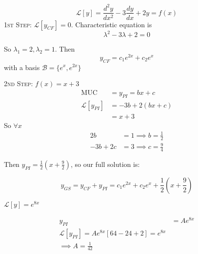 \documentclass[10pt]{scrartcl}
\begin{document}
\begin{example}
\[\mathcal{L}[y] = \frac{d^2y}{dx^2} - 3\frac{dy}{dx} + 2y = f(x)\]	
\textsc{1st Step:} $\mathcal{L}[y_{CF}] = 0$. Characteristic equation is 
\[
  \lambda^2 - 3\lambda + 2 = 0
\]

So $\lambda_1 = 2, \lambda_2 = 1$. Then 
\[y_{CF} = c_1e^{2x} + c_2e^{x}\]
with a basis $\mathcal{B} = \{e^{x}, e^{2x}\}$

\textsc{2nd Step:} $f(x) = x+3$
\[
\begin{aligned}
  \mathrm{MUC} &= y_{PI} = bx + c\\
  \mathcal{L}[y_{PI}] &= -3b + 2(bx + c)\\
  &= x + 3
\end{aligned}
\]
So $\forall x$ 
\[
\begin{aligned}
  2b &= 1 \implies b = \frac{1}{2}\\
  -3b + 2c &= 3 \implies c = \frac{9}{4}
\end{aligned}
\]

Then $y_{PI} = \frac{1}{2}(x+\frac{9}{2})$, so our full solution is:

\[y_{GS} = y_{CF} + y_{PI} = c_1e^{2x} + c_2e^x + \frac{1}{2}\left(x+\frac{9}{2}\right)\]

\end{example}\vspace*{5pt}

\begin{example}

$\mathcal{L}[y] = e^{8x}$

\[
\begin{aligned}
  y_{PI} &= Ae^{8x}\\
  \mathcal{L}[y_{PI}] = Ae^{8x}[64 -24 +2] = e^{8x}\\
  \implies A = \frac{1}{42}
\end{aligned}
\]
\end{example}~
\end{document}
